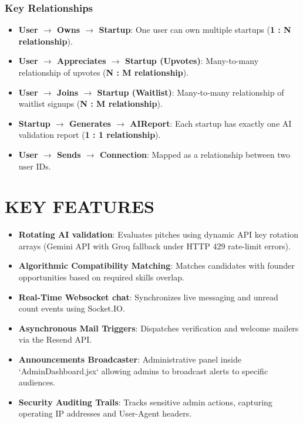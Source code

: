 \documentclass[12pt,a4paper]{report}
\begin{document}
\subsection{Key Relationships}
\begin{itemize}
    \item \textbf{User $\rightarrow$ Owns $\rightarrow$ Startup}: One user can own multiple startups (\textbf{1 : N relationship}).
    \item \textbf{User $\rightarrow$ Appreciates $\rightarrow$ Startup (Upvotes)}: Many-to-many relationship of upvotes (\textbf{N : M relationship}).
    \item \textbf{User $\rightarrow$ Joins $\rightarrow$ Startup (Waitlist)}: Many-to-many relationship of waitlist signups (\textbf{N : M relationship}).
    \item \textbf{Startup $\rightarrow$ Generates $\rightarrow$ AIReport}: Each startup has exactly one AI validation report (\textbf{1 : 1 relationship}).
    \item \textbf{User $\rightarrow$ Sends $\rightarrow$ Connection}: Mapped as a relationship between two user IDs.
\end{itemize}

\chapter{KEY FEATURES}
\begin{itemize}
    \item \textbf{Rotating AI validation}: Evaluates pitches using dynamic API key rotation arrays (Gemini API with Groq fallback under HTTP 429 rate-limit errors).
    \item \textbf{Algorithmic Compatibility Matching}: Matches candidates with founder opportunities based on required skills overlap.
    \item \textbf{Real-Time Websocket chat}: Synchronizes live messaging and unread count events using Socket.IO.
    \item \textbf{Asynchronous Mail Triggers}: Dispatches verification and welcome mailers via the Resend API.
    \item \textbf{Announcements Broadcaster}: Administrative panel inside `AdminDashboard.jsx` allowing admins to broadcast alerts to specific audiences.
    \item \textbf{Security Auditing Trails}: Tracks sensitive admin actions, capturing operating IP addresses and User-Agent headers.
\end{itemize}
\end{document}
